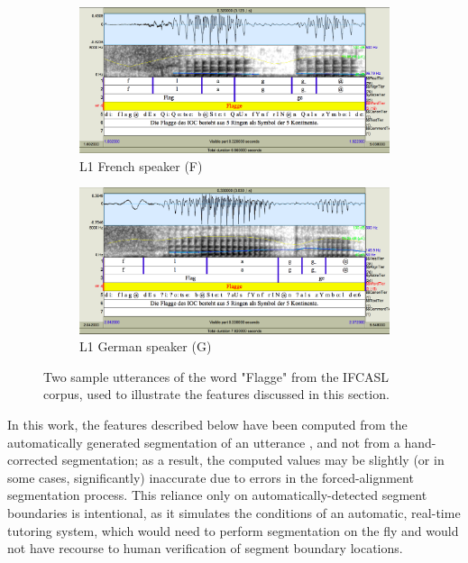 	\begin{figure}
		\centering
		\begin{subfigure}[t]{\textwidth}
                \includegraphics[width=\textwidth]{img/screenshots/2SH05_FGMB1_527-flagge}
                \caption{L1 French speaker (F)}
                \label{fig:featuresexample:fg}
        \end{subfigure}%
        \vspace{1.5em}
                \vspace{1.5em}

        \begin{subfigure}[b]{\textwidth}
                \includegraphics[width=\textwidth]{img/screenshots/2SH05_GGMB2_035-flagge}
                \caption{L1 German speaker (G)}
                \label{fig:featuresexample:gg}
        \end{subfigure}%
		\caption{Two sample utterances of the word "Flagge" from the IFCASL corpus, used to illustrate the features discussed in this section. }
		\label{fig:featuresexample}
	\end{figure}
	
In this work, the features described below have been computed from the automatically generated segmentation of an utterance , and not from a hand-corrected segmentation; as a result, the computed values may be slightly (or in some cases, significantly) inaccurate due to errors in the forced-alignment segmentation process. This reliance only on automatically-detected segment boundaries is intentional, as it simulates the conditions of an automatic, real-time tutoring system, which would need to perform segmentation on the fly and would not have recourse to human verification of segment boundary locations.

